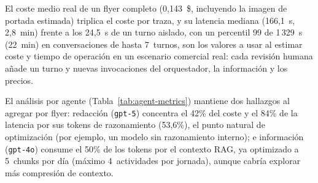 El coste medio real de un flyer completo (0{,}143~\$, incluyendo la imagen de portada estimada) triplica el coste por traza, y su latencia mediana (166{,}1~s, 2{,}8~min) frente a los 24{,}5~s de un turno aislado, con un percentil 99 de 1\,329~s (22~min) en conversaciones de hasta 7~turnos, son los valores a usar al estimar coste y tiempo de operación en un escenario comercial real: cada revisión humana añade un turno y nuevas invocaciones del orquestador, la información y los precios.

El análisis por agente (Tabla~\ref{tab:agent-metrics}) mantiene dos hallazgos al agregar por flyer: redacción (\texttt{gpt-5}) concentra el 42\% del coste y el 84\% de la latencia por sus tokens de razonamiento (53{,}6\%), el punto natural de optimización (por ejemplo, un modelo sin razonamiento interno); e información (\texttt{gpt-4o}) consume el 50\% de los tokens por el contexto RAG, ya optimizado a 5~chunks por día (máximo 4~actividades por jornada), aunque cabría explorar más compresión de contexto.
